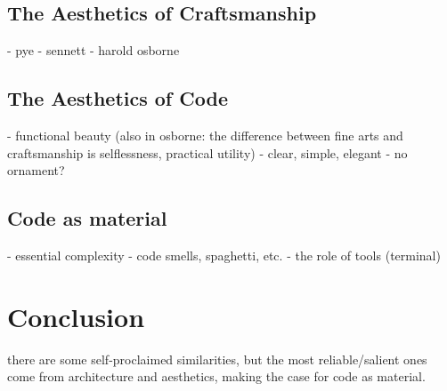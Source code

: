\documentclass{article}
\begin{document}
\subsection{The Aesthetics of Craftsmanship}

- pye
- sennett
- harold osborne

\subsection{The Aesthetics of Code}

- functional beauty (also in osborne: the difference between fine arts and craftsmanship is selflessness, practical utility)
- clear, simple, elegant
- no ornament?

\subsection{Code as material}

- essential complexity
- code smells, spaghetti, etc.
- the role of tools (terminal)

\section{Conclusion}

there are some self-proclaimed similarities, but the most reliable/salient ones come from architecture and aesthetics, making the case for code as material.
\end{document}
